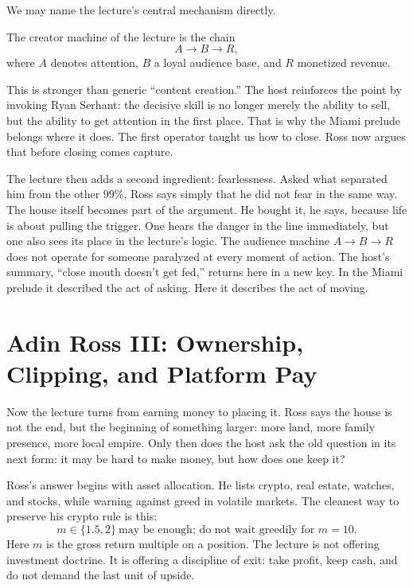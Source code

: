 We may name the lecture's central mechanism directly.

\begin{definition}
The creator machine of the lecture is the chain
\begin{equation}
A \to B \to R,
\end{equation}
where \(A\) denotes attention, \(B\) a loyal audience base, and \(R\) monetized revenue.
\end{definition}

This is stronger than generic ``content creation.'' The host reinforces the point by invoking Ryan Serhant: the decisive skill is no longer merely the ability to sell, but the ability to get attention in the first place. That is why the Miami prelude belongs where it does. The first operator taught us how to close. Ross now argues that before closing comes capture.

The lecture then adds a second ingredient: fearlessness. Asked what separated him from the other \(99\%\), Ross says simply that he did not fear in the same way. The house itself becomes part of the argument. He bought it, he says, because life is about pulling the trigger. One hears the danger in the line immediately, but one also sees its place in the lecture's logic. The audience machine \(A \to B \to R\) does not operate for someone paralyzed at every moment of action. The host's summary, ``close mouth doesn't get fed,'' returns here in a new key. In the Miami prelude it described the act of asking. Here it describes the act of moving.

\section{Adin Ross III: Ownership, Clipping, and Platform Pay}

Now the lecture turns from earning money to placing it. Ross says the house is not the end, but the beginning of something larger: more land, more family presence, more local empire. Only then does the host ask the old question in its next form: it may be hard to make money, but how does one keep it?

Ross's answer begins with asset allocation. He lists crypto, real estate, watches, and stocks, while warning against greed in volatile markets. The cleanest way to preserve his crypto rule is this:
\begin{equation}
m\in\{1.5,2\}\ \text{may be enough; do not wait greedily for }m=10.
\end{equation}
Here \(m\) is the gross return multiple on a position. The lecture is not offering investment doctrine. It is offering a discipline of exit: take profit, keep cash, and do not demand the last unit of upside.

